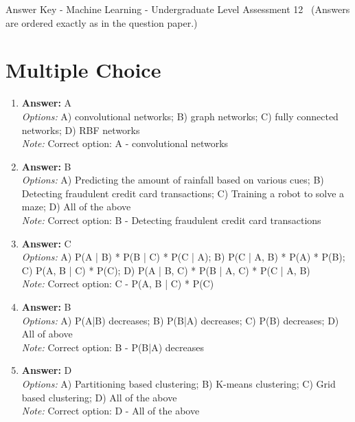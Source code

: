 \documentclass[12pt]{article}
\begin{document}
\begin{center}
Answer Key - Machine Learning - Undergraduate Level Assessment 12 \
\small (Answers are ordered exactly as in the question paper.)
\end{center}

\section*{Multiple Choice}
\begin{enumerate}[label=\arabic*.]
\item \textbf{Answer:} A
\\ \textit{Options:} A) convolutional networks; B) graph networks; C) fully connected networks; D) RBF networks
\\ \textit{Note:} Correct option: A - convolutional networks
\item \textbf{Answer:} B
\\ \textit{Options:} A) Predicting the amount of rainfall based on various cues; B) Detecting fraudulent credit card transactions; C) Training a robot to solve a maze; D) All of the above
\\ \textit{Note:} Correct option: B - Detecting fraudulent credit card transactions
\item \textbf{Answer:} C
\\ \textit{Options:} A) P(A | B) * P(B | C) * P(C | A); B) P(C | A, B) * P(A) * P(B); C) P(A, B | C) * P(C); D) P(A | B, C) * P(B | A, C) * P(C | A, B)
\\ \textit{Note:} Correct option: C - P(A, B | C) * P(C)
\item \textbf{Answer:} B
\\ \textit{Options:} A) P(A|B) decreases; B) P(B|A) decreases; C) P(B) decreases; D) All of above
\\ \textit{Note:} Correct option: B - P(B|A) decreases
\item \textbf{Answer:} D
\\ \textit{Options:} A) Partitioning based clustering; B) K-means clustering; C) Grid based clustering; D) All of the above
\\ \textit{Note:} Correct option: D - All of the above
\end{enumerate}
\end{document}
